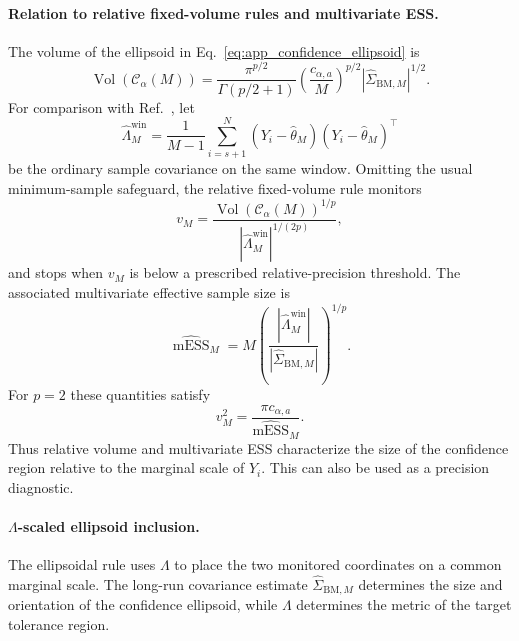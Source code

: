 \documentclass[showpacs,amsmath,amssymb,twocolumn,prx,superscriptaddress,10pt,aps,nofootinbib]{revtex4-2}
\begin{document}
\paragraph{Relation to relative fixed-volume rules and multivariate ESS.}
The volume of the ellipsoid in Eq.~\eqref{eq:app_confidence_ellipsoid} is
\begin{equation}
\label{eq:app_confidence_volume}
    \operatorname{Vol}(\mathcal C_\alpha(M))
    =
    \frac{\pi^{p/2}}{\Gamma(p/2+1)}
    \left(\frac{c_{\alpha,a}}{M}\right)^{p/2}
    \left|\widehat\Sigma_{\mathrm{BM},M}\right|^{1/2}.
\end{equation}
For comparison with Ref.~\cite{vats2019multivariate}, let
\begin{equation}
\label{eq:app_lambda_window_estimator}
    \widehat\Lambda_M^{\mathrm{win}}
    =
    \frac{1}{M-1}
    \sum_{i=s+1}^{N}
    (Y_i-\widehat\theta_M)
    (Y_i-\widehat\theta_M)^\top
\end{equation}
be the ordinary sample covariance on the same window. Omitting the usual minimum-sample
safeguard, the relative fixed-volume rule monitors
\begin{equation}
\label{eq:app_relative_volume}
    v_M
    =
    \frac{
        \operatorname{Vol}(\mathcal C_\alpha(M))^{1/p}
    }{
        |\widehat\Lambda_M^{\mathrm{win}}|^{1/(2p)}
    },
\end{equation}
and stops when $v_M$ is below a prescribed relative-precision threshold. The associated
multivariate effective sample size is
\begin{equation}
\label{eq:app_mess}
    \widehat{\operatorname{mESS}}_M
    =
    M
    \left(
        \frac{|\widehat\Lambda_M^{\mathrm{win}}|}
             {|\widehat\Sigma_{\mathrm{BM},M}|}
    \right)^{1/p}.
\end{equation}
For $p=2$ these quantities satisfy
\begin{equation}
\label{eq:app_volume_mess_relation}
    v_M^2
    =
    \frac{\pi c_{\alpha,a}}
         {\widehat{\operatorname{mESS}}_M}.
\end{equation}
Thus relative volume and multivariate ESS characterize the size of the confidence region
relative to the marginal scale of $Y_i$. This can also be used as a precision diagnostic.


\paragraph{$\Lambda$-scaled ellipsoid inclusion.}
The ellipsoidal rule uses $\Lambda$ to place the two monitored coordinates on a common marginal scale. The long-run covariance estimate $\widehat\Sigma_{\mathrm{BM},M}$ determines the size and orientation of the confidence ellipsoid, while $\Lambda$ determines the metric of the target tolerance region.
\end{document}
